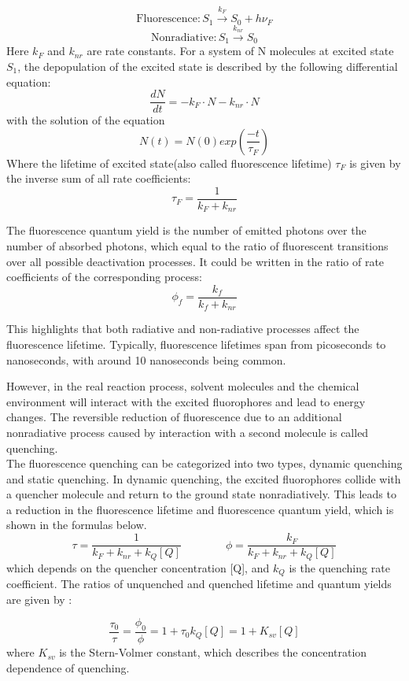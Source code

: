 \documentclass[a4paper,english,12pt,bibliography=totoc]{scrreprt}
\begin{document}
\[
\mathrm{Fluorescence}: S_1 \stackrel{k_F}{\longrightarrow} S_0 + h\nu_F
\]
\[
\mathrm{Nonradiative}: S_1 \stackrel{k_{nr}}{\longrightarrow} S_0
\]
Here $k_F$ and $k_{nr}$ are rate constants. For a system of N molecules at excited state $S_1$, the depopulation of the excited state is described by the following differential equation:
\[
\frac{dN}{dt} = -k_F\cdot N - k_{nr}\cdot N
\]
with the solution of the equation
\[
N(t) = N(0)exp(\frac{-t}{\tau_F})
\]
Where the lifetime of excited state(also called fluorescence lifetime) $\tau_F$ is given by the inverse sum of all rate coefficients:
\[
\tau_F = \frac{1}{k_F+k_{nr}}
\]

The fluorescence quantum yield is the number of emitted photons over the number of absorbed photons, which equal to the ratio of fluorescent transitions over all possible deactivation processes. It could be written in the ratio of rate coefficients of the corresponding process:
\[
\phi_f = \frac{k_f}{k_f+k_{nr}}
\]

This highlights that both radiative and non-radiative processes affect the fluorescence lifetime. Typically, fluorescence lifetimes span from picoseconds to nanoseconds, with around 10 nanoseconds being common.


However, in the real reaction process, solvent molecules and the chemical environment will interact with the excited fluorophores and lead to energy changes. The reversible reduction of fluorescence due to an additional nonradiative process caused by interaction with a second molecule is called quenching. \\

The fluorescence quenching can be categorized into two types, dynamic quenching and static quenching. In dynamic quenching, the excited fluorophores collide with a quencher molecule and return to the ground state nonradiatively. This leads to a reduction in the fluorescence lifetime and fluorescence quantum yield, which is shown in the formulas below.
\[
\tau = \frac{1}{k_F+k_{nr}+k_Q[Q]} \qquad \qquad   \phi = \frac{k_F}{k_F+k_{nr}+k_Q[Q]}
\]
which depends on the quencher concentration [Q], and $k_Q$ is the quenching rate coefficient. The ratios of unquenched and quenched lifetime and quantum yields are given by :

\[
\frac{\tau_0}{\tau} = \frac{\phi_0}{\phi} =  1 + \tau_0k_Q[Q] = 1+ K_{sv}[Q]
\]
where $K_{sv}$ is the Stern-Volmer constant, which describes the concentration dependence of quenching.\\
\end{document}
